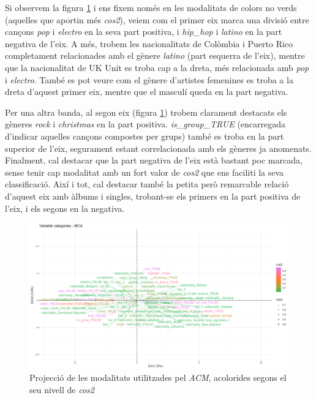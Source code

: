 Si observem la figura \ref{fig:ACM1_variablesCos2} i ens fixem només en les modalitats de colors no verds (aquelles que aportin més \textit{cos2}), veiem com el primer eix marca una divisió entre cançons \textit{pop} i \textit{electro} en la seva part positiva, i \textit{hip\_hop} i \textit{latino} en la part negativa de l'eix. A més, trobem les nacionalitats de Colòmbia i Puerto Rico completament relacionades amb el gènere \textit{latino} (part esquerra de l'eix), mentre que la nacionalitat de UK Unit es troba cap a la dreta, més relacionada amb \textit{pop} i \textit{electro}. També es pot veure com el gènere d'artistes femenines es troba a la dreta d'aquest primer eix, mentre que el masculí queda en la part negativa.

Per una altra banda, al segon eix (figura \ref{fig:ACM1_variablesCos2}) trobem clarament destacats els gèneres \textit{rock} i \textit{christmas} en la part positiva. \textit{is\_group\_TRUE} (encarregada d'indicar aquelles cançons compostes per grups) també es troba en la part superior de l'eix, segurament estant correlacionada amb els gèneres ja anomenats. Finalment, cal destacar que la part negativa de l'eix està bastant poc marcada, sense tenir cap modalitat amb un fort valor de \textit{cos2} que ens faciliti la seva classificació. Així i tot, cal destacar també la petita però remarcable relació d'aquest eix amb àlbums i singles, trobant-se els primers en la part positiva de l'eix, i els segons en la negativa.

\begin{figure}[H]
    \centering
    \includegraphics[width=0.8\linewidth]{Images/6_Factorial_Methods/ACM/ACM1_variablesCos2.png}
    \caption{Projecció de les modalitats utilitzades pel \textit{ACM}, acolorides segons el seu nivell de \textit{cos2}}
    \label{fig:ACM1_variablesCos2}
\end{figure}

